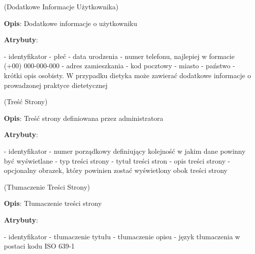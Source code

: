 \begin{enumerate}[label={\textbf{KAT/\protect\threedigits{\theenumi}}}, wide, labelwidth=!, labelindent=0pt, labelsep=0pt, series=reqs]
     \label{kat:UserExtraInfo} (Dodatkowe Informacje Użytkownika)

    \textbf{Opis}: Dodatkowe informacje o użytkowniku
    \par
    \textbf{Atrybuty}:
    \begin{itemize}[series=atr, wide, align=left, leftmargin=5cm]
         \label{kat:UserExtraInfo:id} - identyfikator
         \label{kat:UserExtraInfo:gender} - płeć
         \label{kat:UserExtraInfo:dateOfBirth} - data urodzenia
         \label{kat:UserExtraInfo:phoneNumber} - numer telefonu, najlepiej w formacie (+00) 000-000-000
         \label{kat:UserExtraInfo:streetAddress} - adres zamieszkania
         \label{kat:UserExtraInfo:postalCode} - kod pocztowy
         \label{kat:UserExtraInfo:city} - miasto
         \label{kat:UserExtraInfo:country} - państwo
         \label{kat:UserExtraInfo:personalDescription} - krótki opis osobisty. W przypadku dietyka może zawierać dodatkowe informacje o prowadzonej praktyce dietetycznej
    \end{itemize}

     \label{kat:SiteContent} (Treść Strony)

    \textbf{Opis}: Treść strony definiowana przez administratora
    \par
    \textbf{Atrybuty}:
    \begin{itemize}[series=atr, wide, align=left, leftmargin=5cm]
         \label{kat:SiteContent:id} - identyfikator
         \label{kat:SiteContent:ordinalNumber} - numer porządkowy definiujący kolejność w jakim dane powinny być wyświetlane
         \label{kat:SiteContent:siteContentType} - typ treści strony
         \label{kat:SiteContent:title} - tytuł treści stron
         \label{kat:SiteContent:description} - opis treści strony
         \label{kat:SiteContent:image} - opcjonalny obrazek, który powinien zostać wyświetlony obok treści strony
    \end{itemize}

     \label{kat:SiteContentTranslation} (Tłumaczenie Treści Strony)

    \textbf{Opis}: Tłumaczenie treści strony
    \par
    \textbf{Atrybuty}:
    \begin{itemize}[series=atr, wide, align=left, leftmargin=5cm]
         \label{kat:SiteContentTranslation:id} - identyfikator
         \label{kat:SiteContentTranslation:title} - tłumaczenie tytułu
         \label{kat:SiteContentTranslation:description} - tłumaczenie opisu
         \label{kat:SiteContentTranslation:language} - język tłumaczenia w postaci kodu ISO 639-1
    \end{itemize}


\end{enumerate}
